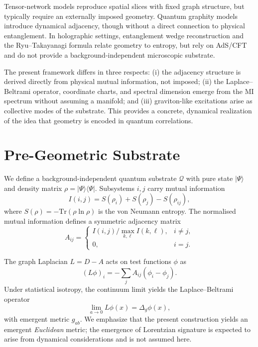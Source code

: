\documentclass[aps,prd,twocolumn,nofootinbib,superscriptaddress]{revtex4-2}
\begin{document}
Tensor-network models reproduce spatial slices with fixed graph structure, but typically require an externally imposed geometry. Quantum graphity models introduce dynamical adjacency, though without a direct connection to physical entanglement. In holographic settings, entanglement wedge reconstruction and the Ryu--Takayanagi formula relate geometry to entropy, but rely on AdS/CFT and do not provide a background-independent microscopic substrate.

The present framework differs in three respects: (i) the adjacency structure is derived directly from physical mutual information, not imposed; (ii) the Laplace--Beltrami operator, coordinate charts, and spectral dimension emerge from the MI spectrum without assuming a manifold; and (iii) graviton-like excitations arise as collective modes of the substrate. This provides a concrete, dynamical realization of the idea that geometry is encoded in quantum correlations.

\section{Pre-Geometric Substrate}

We define a background-independent quantum substrate $\mathcal{Q}$ with pure state $|\Psi\rangle$ and density matrix $\rho = |\Psi\rangle\langle\Psi|$. Subsystems $i,j$ carry mutual information
\begin{equation}
I(i,j) = S(\rho_i) + S(\rho_j) - S(\rho_{ij}),
\end{equation}
where $S(\rho) = -\mathrm{Tr}(\rho\ln\rho)$ is the von Neumann entropy. The normalised mutual information defines a symmetric adjacency matrix
\begin{equation}
A_{ij} =
\begin{cases}
I(i,j)/\max_{k,\ell} I(k,\ell), & i\neq j,\\
0, & i=j.
\end{cases}
\end{equation}

The graph Laplacian $L = D - A$ acts on test functions $\phi$ as
\begin{equation}
(L\phi)_i = -\sum_j A_{ij}(\phi_i - \phi_j).
\end{equation}
Under statistical isotropy, the continuum limit yields the Laplace--Beltrami operator
\begin{equation}
\lim_{a\to0} L\phi(x) = \Delta_g \phi(x),
\end{equation}
with emergent metric $g_{ab}$.  
We emphasize that the present construction yields an emergent \emph{Euclidean} metric; the emergence of Lorentzian signature is expected to arise from dynamical considerations and is not assumed here.
\end{document}
